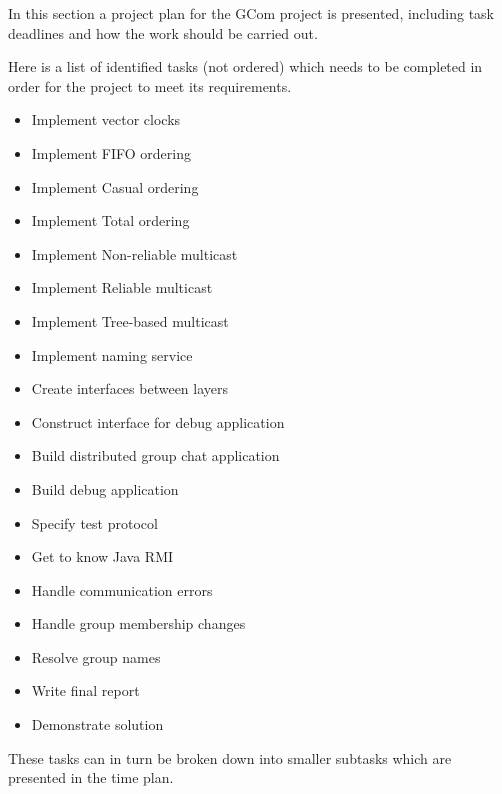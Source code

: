 
	In this section a project plan for the GCom project is presented, including task deadlines and how the work should be carried out.

		Here is a list of identified tasks (not ordered) which needs to be completed in order for the project to meet its requirements.
		\begin{itemize}
			\item Implement vector clocks
			\item Implement FIFO ordering
			\item Implement Casual ordering
			\item Implement Total ordering
			\item Implement Non-reliable multicast
			\item Implement Reliable multicast
			\item Implement Tree-based multicast
			\item Implement naming service
			\item Create interfaces between layers
			\item Construct interface for debug application
			\item Build distributed group chat application
			\item Build debug application
			\item Specify test protocol
			\item Get to know Java RMI
			\item Handle communication errors
			\item Handle group membership changes
			\item Resolve group names
			\item Write final report
			\item Demonstrate solution
		\end{itemize}

		These tasks can in turn be broken down into smaller subtasks which are presented in the time plan.


